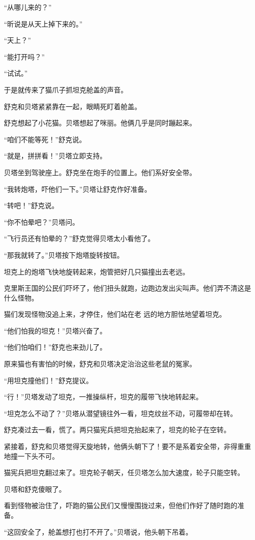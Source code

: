 \documentclass[a4paper,12pt,UTF8,twoside]{ctexbook}
\begin{document}
“从哪儿来的？”

“昕说是从天上掉下来的。”

“天上？”

“能打开吗？”

“试试。”

于是就传来了猫爪子抓坦克舱盖的声音。

舒克和贝塔紧紧靠在一起，眼睛死盯着舱盖。

舒克想起了小花猫。贝塔想起了咪丽。他俩几乎是同时蹦起来。

“咱们不能等死！”舒克说。

“就是，拼拼看！”贝塔立即支持。

贝塔坐到驾驶座上。舒克坐在炮手的位置上。他们系好安全带。

“我转炮塔，吓他们一下。”贝塔让舒克作好准备。

“转吧！”舒克说。

“你不怕晕吧？”贝塔问。

“飞行员还有怕晕的？”舒克觉得贝塔太小看他了。

“那我就转了。”贝塔按下炮塔旋转按钮。

坦克上的炮塔飞快地旋转起来，炮管把好几只猫撞出去老远。

克里斯王国的公民们吓坏了，他们扭头就跑，边跑边发出尖叫声。他们弄不清这是什么怪物。

猫们发现怪物没追上来，才停住，他们站在老 远的地方胆怯地望着坦克。

“他们怕我的坦克！”贝塔兴奋了。

“他们怕咱们！”舒克也来劲儿了。

原来猫也有害怕的时候，舒克和贝塔决定治治这些老鼠的冤家。

“用坦克撞他们！”舒克提议。

“行！”贝塔发动了坦克，一推操纵杆，坦克的履带飞快地转起来。

“坦克怎么不动了？”贝塔从潜望镜往外一看，坦克纹丝不动，可履带却在转。

舒克凑过去一看，慌了。两只猫宪兵把坦克抬起来了，坦克的轮子在空转。

紧接着，舒克和贝塔觉得天旋地转，他俩头朝下了！要不是系着安全带，非得重重地撞一下头不可。

猫宪兵把坦克翻过来了。坦克轮子朝天，任贝塔怎么加大速度，轮子只能空转。

贝塔和舒克傻眼了。

看到怪物被治住了，吓跑的猫公民们又慢慢围拢过来，但他们作好了随时跑的准备。

“这回安全了，舱盖想打也打不开了。”贝塔说，他头朝下吊着。
\end{document}

